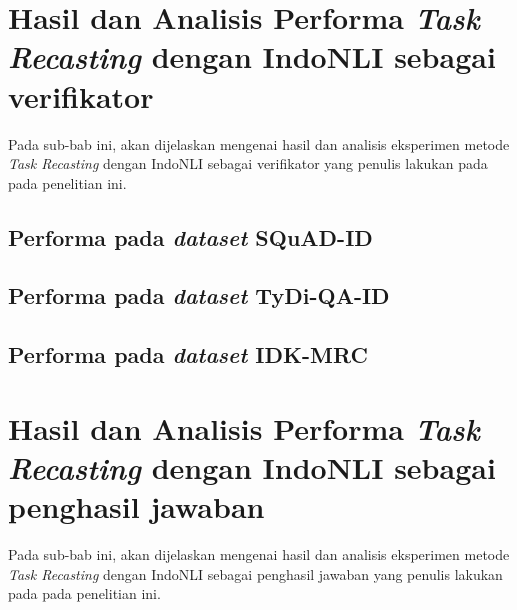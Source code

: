 \section{Hasil dan Analisis Performa \emph{Task Recasting} dengan IndoNLI sebagai verifikator}
Pada sub-bab ini, akan dijelaskan mengenai hasil dan analisis eksperimen metode \emph{Task Recasting} dengan IndoNLI sebagai verifikator yang penulis lakukan pada pada penelitian ini. 

\subsection{Performa pada  \emph{dataset} SQuAD-ID}

\subsection{Performa pada  \emph{dataset} TyDi-QA-ID}

\subsection{Performa pada  \emph{dataset} IDK-MRC}

\section{Hasil dan Analisis Performa \emph{Task Recasting} dengan IndoNLI sebagai penghasil jawaban}
Pada sub-bab ini, akan dijelaskan mengenai hasil dan analisis eksperimen metode \emph{Task Recasting} dengan IndoNLI sebagai penghasil jawaban yang penulis lakukan pada pada penelitian ini. 

